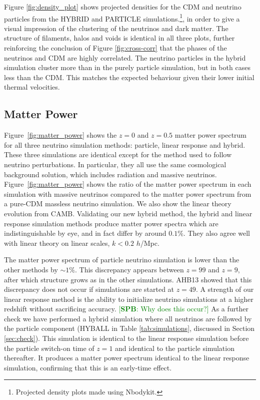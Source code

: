 \documentclass[useAMS, usenatbib]{mnras}
\newcommand{\spb}[1]{{\textcolor{green}{[{\bf SPB}: #1]}}}
\begin{document}
Figure \ref{fig:density_plot} shows projected densities for the CDM and neutrino particles from the HYBRID and PARTICLE simulations.\footnote{Projected density plots made using Nbodykit.}, in order to give a visual impression of the clustering of the neutrinos and dark matter. The structure of filaments, halos and voids is identical in all three plots, further reinforcing the conclusion of Figure \ref{fig:cross-corr} that the phases of the neutrinos and CDM are highly correlated. The neutrino particles in the hybrid simulation cluster more than in the purely particle simulation, but in both cases less than the CDM. This matches the expected behaviour given their lower initial thermal velocities.

\subsection{Matter Power}
\label{sec:matterpower}

Figure~\ref{fig:matter_power} shows the $z=0$ and $z=0.5$ matter power spectrum for all three neutrino simulation methods: particle, linear response and hybrid. These three simulations are identical except for the method used to follow neutrino perturbations. In particular, they all use the same cosmological background solution, which includes radiation and massive neutrinos. Figure~\ref{fig:matter_power} shows the ratio of the matter power spectrum in each simulation with massive neutrinos compared to the matter power spectrum from a pure-CDM massless neutrino simulation. We also show the linear theory evolution from CAMB. Validating our new hybrid method, the hybrid and linear response simulation methods produce matter power spectra which are indistinguishable by eye, and in fact differ by around $0.1\%$. They also agree well with linear theory on linear scales, $k < 0.2$ $h$/Mpc.

The matter power spectrum of particle neutrino simulation is lower than the other methods by $\sim 1\%$. This discrepancy appears between $z=99$ and $z=9$, after which structure grows as in the other simulations. AHB13 showed that this discrepancy does not occur if simulations are started at $z=49$. A strength of our linear response method is the ability to initialize neutrino simulations at a higher redshift without sacrificing accuracy. \spb{Why does this occur?}
As a further check we have performed a hybrid simulation where all neutrinos are followed by the particle component (HYBALL in Table \ref{tab:simulations}, discussed in Section \ref{sec:check}). This simulation is identical to the linear response simulation before the particle switch-on time of $z=1$ and identical to the particle simulation thereafter. It produces a matter power spectrum identical to the linear response simulation, confirming that this is an early-time effect.
\end{document}
